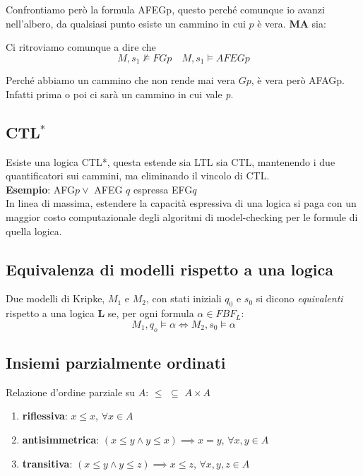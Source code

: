 Confrontiamo però la formula AFEGp, questo perché comunque io avanzi nell'albero, da qualsiasi punto esiste un cammino in cui $p$ è vera. \textbf{MA} sia:

{\centering
{}
\par}
Ci ritroviamo comunque a dire che
\[M,s_1 \nvDash FGp \quad M,s_1 \vDash AFEGp\]

Perché abbiamo un cammino che non rende mai vera $Gp$, è vera però AFAGp. Infatti prima o poi ci sarà un cammino in cui vale \textit{p}.
\subsection{CTL$^*$}
Esiste una logica CTL*, questa estende sia LTL sia CTL, mantenendo i due quantificatori sui cammini, ma eliminando il vincolo di CTL.\\
\textbf{Esempio}: AFG$p \lor$ AFEG $q$ espressa EFG$q$\\

In linea di massima, estendere la capacità espressiva di una logica si paga con un maggior costo computazionale degli algoritmi di model-checking per le formule di quella logica.

\subsection{Equivalenza di modelli rispetto a una logica}
Due modelli di Kripke, $M_1$ e $M_2$, con stati iniziali $q_0$ e $s_0$ si dicono \textit{equivalenti} rispetto a una logica \textbf{L} se, per ogni formula $\alpha \in FBF_L$: \[M_1, q_o \vDash \alpha \iff M_2, s_0 \vDash \alpha\]

\subsection{Insiemi parzialmente ordinati}
Relazione d’ordine parziale su $A$: $\leq$ $\subseteq$ $A \times A$
\begin{enumerate}
    \item \textbf{riflessiva}: $x \leq x$, $\forall x \in A$
    \item \textbf{antisimmetrica}: $(x \leq y \land y \leq x) \implies x = y$, $\forall x, y \in A$
    \item \textbf{transitiva}: $(x \leq y \land y \leq z) \implies x \leq z$, $\forall x,y,z \in A$
\end{enumerate}


